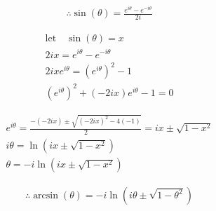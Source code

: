 \documentclass{../style}
\begin{document}
\euler

\begin{gather*}
	\therefore \sin(\theta) = \frac{e^{i\theta} - e^{-i\theta}}{2i}
\end{gather*}

\begin{gather*}
	\text{let} \quad \sin(\theta) = x \\
	2ix = e^{i\theta} - e^{-i\theta} \\
	2ixe^{i\theta} = (e^{i\theta})^2 - 1 \\ 
	(e^{i\theta})^2 + (-2ix)e^{i\theta} - 1 = 0
\end{gather*}

\begin{gather*}
	e^{i\theta} = \frac{-(-2ix) \pm \sqrt{(-2ix)^2 - 4(-1)}}{2} = ix \pm \sqrt{1 - x^2} \\
	i\theta = \ln(ix \pm \sqrt{1 - x^2}) \\
	\theta = -i\ln(ix \pm \sqrt{1 - x^2})
\end{gather*}

\begin{gather*}
	\therefore \arcsin(\theta) = -i\ln(i\theta \pm \sqrt{1 -\theta^2})
\end{gather*}
\end{document}
